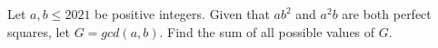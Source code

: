 Let $a, b \le 2021$ be positive integers. Given that $ab^2$ and $a^2b$ are both perfect squares, let $G = gcd(a, b)$. Find the sum of all possible values of $G$.
